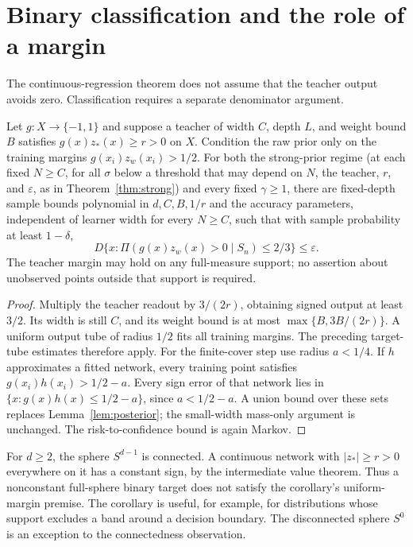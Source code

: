 \documentclass[11pt]{article}
\theoremstyle{remark}\newtheorem{remark}[theorem]{Remark}
\begin{document}
\section{Binary classification and the role of a margin}\label{sec:classification}
The continuous-regression theorem does not assume that the teacher output
avoids zero. Classification requires a separate denominator argument.

\begin{corollary}
\label{cor:classification}
Let $g:X\to\{-1,1\}$ and suppose a teacher of width $C$, depth $L$,
and weight bound $B$ satisfies $g(x)z_*(x)\geq r>0$ on $X$.
Condition the raw prior only on the training margins
$g(x_i)z_w(x_i)>1/2$. For both the strong-prior regime (at each fixed
$N\geq C$, for all $\sigma$ below a threshold that may depend on $N$, the
teacher, $r$, and $\varepsilon$, as in Theorem~\ref{thm:strong}) and every
fixed $\gamma\geq1$, there are fixed-depth sample bounds polynomial in
$d,C,B,1/r$ and the accuracy parameters, independent of learner width
for every $N\geq C$, such that with sample probability at least
$1-\delta$,
\[
 D\{x:\Pi(g(x)z_w(x)>0\mid S_n)\leq2/3\}\leq\varepsilon.
\]
The teacher margin may hold on any full-measure support; no assertion
about unobserved points outside that support is required.
\end{corollary}
\begin{proof}
Multiply the teacher readout by $3/(2r)$, obtaining signed output at
least $3/2$. Its width is still $C$, and its weight bound is at most
$\max\{B,3B/(2r)\}$. A uniform output tube of radius $1/2$ fits all
training margins. The preceding target-tube estimates therefore apply.
For the finite-cover step use radius $a<1/4$. If $h$ approximates a
fitted network, every training point satisfies $g(x_i)h(x_i)>1/2-a$.
Every sign error of that network lies in
$\{x:g(x)h(x)\leq1/2-a\}$, since $a<1/2-a$. A union bound over
these sets replaces Lemma~\ref{lem:posterior}; the small-width mass-only
argument is unchanged. The risk-to-confidence bound is again Markov.
\end{proof}

For $d\geq2$, the sphere $S^{d-1}$ is connected. A continuous network
with $|z_*|\geq r>0$ everywhere on it has a constant sign, by the
intermediate value theorem. Thus a nonconstant full-sphere binary target
does not satisfy the corollary's uniform-margin premise. The corollary is
useful, for example, for distributions whose support excludes a band around
a decision boundary. The disconnected sphere $S^0$ is an exception to
the connectedness observation.
\end{document}
